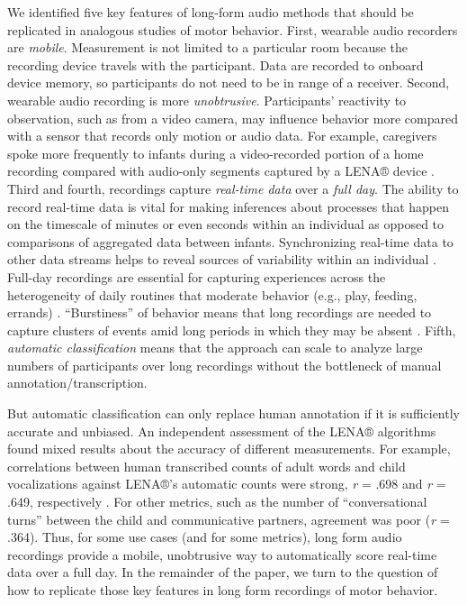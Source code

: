 \documentclass[
  man]{apa6}
\begin{document}
We identified five key features of long-form audio methods that should be replicated in analogous studies of motor behavior. First, wearable audio recorders are \emph{mobile}. Measurement is not limited to a particular room because the recording device travels with the participant. Data are recorded to onboard device memory, so participants do not need to be in range of a receiver. Second, wearable audio recording is more \emph{unobtrusive}. Participants' reactivity to observation, such as from a video camera, may influence behavior more compared with a sensor that records only motion or audio data. For example, caregivers spoke more frequently to infants during a video-recorded portion of a home recording compared with audio-only segments captured by a LENA® device \autocite{Bergelson2019Input}. Third and fourth, recordings capture \emph{real-time data} over a \emph{full day}. The ability to record real-time data is vital for making inferences about processes that happen on the timescale of minutes or even seconds within an individual as opposed to comparisons of aggregated data between infants. Synchronizing real-time data to other data streams helps to reveal sources of variability within an individual \autocites[e.g.,][]{WassPhillips2022,MalachowskiSalo2023}. Full-day recordings are essential for capturing experiences across the heterogeneity of daily routines that moderate behavior (e.g., play, feeding, errands) \autocite{KadookaCaufield2021,Tamis-LeMondaCustode2018}. ``Burstiness'' of behavior means that long recordings are needed to capture clusters of events amid long periods in which they may be absent \autocite{BarbaroFausey2022,WarlaumontSobowale2021}. Fifth, \emph{automatic classification} means that the approach can scale to analyze large numbers of participants over long recordings without the bottleneck of manual annotation/transcription.

But automatic classification can only replace human annotation if it is sufficiently accurate and unbiased. An independent assessment of the LENA® algorithms found mixed results about the accuracy of different measurements. For example, correlations between human transcribed counts of adult words and child vocalizations against LENA®'s automatic counts were strong, \emph{r} = .698 and \emph{r} = .649, respectively \autocite{CristiaLavechin2020}. For other metrics, such as the number of ``conversational turns'' between the child and communicative partners, agreement was poor (\emph{r} = .364). Thus, for some use cases (and for some metrics), long form audio recordings provide a mobile, unobtrusive way to automatically score real-time data over a full day. In the remainder of the paper, we turn to the question of how to replicate those key features in long form recordings of motor behavior.
\end{document}
